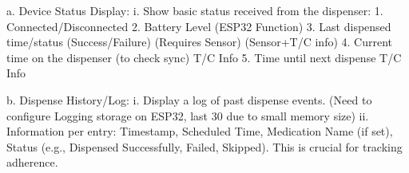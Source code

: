 a. Device Status Display:
i. Show basic status received from the dispenser:
1. Connected/Disconnected
2. Battery Level (ESP32 Function)
3. Last dispensed time/status (Success/Failure) (Requires Sensor) (Sensor+T/C info)
4. Current time on the dispenser (to check sync) T/C Info
5. Time until next dispense T/C Info

b. Dispense History/Log:
i. Display a log of past dispense events. (Need to configure Logging storage on ESP32, last 30 due to small memory size)
ii. Information per entry: Timestamp, Scheduled Time, Medication Name (if set), Status (e.g., Dispensed Successfully, Failed, Skipped). This is crucial for tracking adherence.
